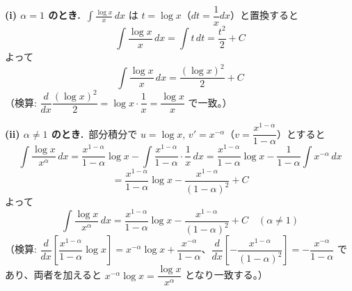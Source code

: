 
\textbf{(i) $\alpha = 1$ のとき.}\ $\displaystyle\int \frac{\log x}{x}\, dx$ は $t = \log x$（$dt = \dfrac{1}{x}dx$）と置換すると
\[
\int \frac{\log x}{x}\, dx = \int t \, dt = \frac{t^{2}}{2} + C
\]
よって
\[
\boxed{\; \int \frac{\log x}{x}\, dx = \frac{(\log x)^{2}}{2} + C \;}
\]
（検算: $\dfrac{d}{dx}\dfrac{(\log x)^{2}}{2} = \log x \cdot \dfrac{1}{x} = \dfrac{\log x}{x}$ で一致。）

\noindent
\textbf{(ii) $\alpha \neq 1$ のとき.}\ 部分積分で $u = \log x$, $v' = x^{-\alpha}$（$v = \dfrac{x^{1-\alpha}}{1-\alpha}$）とすると
\[
\int \frac{\log x}{x^{\alpha}}\, dx
= \frac{x^{1-\alpha}}{1-\alpha}\log x - \int \frac{x^{1-\alpha}}{1-\alpha}\cdot \frac{1}{x}\, dx
= \frac{x^{1-\alpha}}{1-\alpha}\log x - \frac{1}{1-\alpha}\int x^{-\alpha}\, dx
\]
\[
= \frac{x^{1-\alpha}}{1-\alpha}\log x - \frac{x^{1-\alpha}}{(1-\alpha)^{2}} + C
\]
よって
\[
\boxed{\; \int \frac{\log x}{x^{\alpha}}\, dx = \frac{x^{1-\alpha}}{1-\alpha}\log x - \frac{x^{1-\alpha}}{(1-\alpha)^{2}} + C \quad (\alpha \neq 1) \;}
\]
（検算: $\dfrac{d}{dx}\left[\dfrac{x^{1-\alpha}}{1-\alpha}\log x\right] = x^{-\alpha}\log x + \dfrac{x^{-\alpha}}{1-\alpha}$、$\dfrac{d}{dx}\left[-\dfrac{x^{1-\alpha}}{(1-\alpha)^{2}}\right] = -\dfrac{x^{-\alpha}}{1-\alpha}$ であり、両者を加えると $x^{-\alpha}\log x = \dfrac{\log x}{x^{\alpha}}$ となり一致する。）
